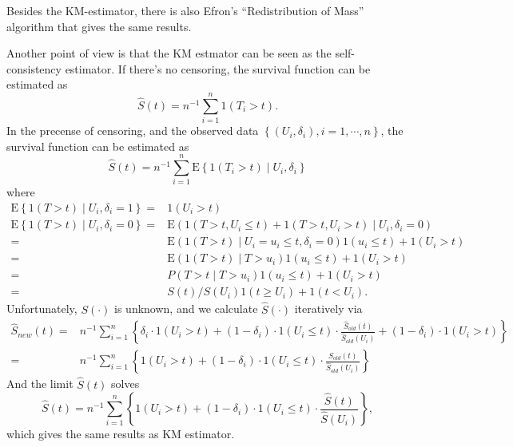 \documentclass[a4paper,12pt]{article}
\begin{document}
Besides the KM-estimator, there is also Efron's ``Redistribution of Mass'' algorithm that gives the same results.
\par
Another point of view is that the KM estmator can be seen as the self-consistency estimator. If there's no censoring, the survival function can be estimated as
\[
  \hat{S}\left(t\right) = n^{-1} \sum\limits_{i = 1}^n1\left(T_i > t\right)
  .
\]
In the precense of censoring, and the observed data $\left\{\left(U_i, \delta_i\right), i = 1, \cdots, n\right\}$, the survival function can be estimated as
\[
  \hat{S}\left(t\right)
  = n^{-1}\sum\limits_{i = 1}^n
  \mathrm{E}\left\{
    1\left(T_i > t\right)
    \middle| U_i, \delta_i
  \right\}
\]
where
\[
  \begin{aligned}
    \mathrm{E}\left\{1\left(T > t\right)\middle| U_i, \delta_i = 1\right\}
    =& 1(U_i > t)    \\
    \mathrm{E}\left\{1\left(T > t\right)\middle| U_i, \delta_i = 0\right\}
    =& \mathrm{E}\left(
       1\left(T > t, U_i \leq t\right)
       + 1\left(T > t, U_i > t\right)\middle| U_i, \delta_i = 0\right)    \\
    =& \mathrm{E}\left(
       1\left(T > t\right)\middle| U_i = u_i \leq t, \delta_i = 0\right)
       1\left(u_i \leq t\right)
       + 1\left(U_i > t\right)    \\
    =& \mathrm{E}\left(
       1\left(T > t\right)\middle| T > u_i\right)
       1\left(u_i \leq t\right)
       + 1\left(U_i > t\right)    \\
        =& P\left(
       T > t\middle| T > u_i\right)
       1\left(u_i \leq t\right)
       + 1\left(U_i > t\right)    \\
    =& S\left(t\right) / S\left(U_i\right) 1\left(t \geq U_i\right)
       + 1\left(t < U_i\right)
       .
  \end{aligned}
\]
Unfortunately, $S\left(\cdot\right)$ is unknown, and we calculate $\hat{S}\left(\cdot\right)$ iteratively via
\[
  \begin{aligned}
    \hat{S}_{new}\left(t\right)
    =& n^{-1}\sum\limits_{i = 1}^n\left\{
       \delta_i \cdot 1\left(U_i > t\right)
       + \left(1 - \delta_i\right) \cdot 1\left(U_i \leq t\right)
       \cdot \frac{\hat{S}_{old}\left(t\right)}{\hat{S}_{old}\left(U_i\right)}
       + \left(1 - \delta_i\right) \cdot 1\left(U_i > t\right)
       \right\}    \\
    =& n^{-1}\sum\limits_{i = 1}^n\left\{
       1\left(U_i > t\right)
       + \left(1 - \delta_i\right) \cdot 1\left(U_i \leq t\right)
       \cdot \frac{\hat{S}_{old}\left(t\right)}{\hat{S}_{old}\left(U_i\right)}
       \right\}
  \end{aligned}
\]
And the limit $\hat{S}\left(t\right)$ solves
\[
  \hat{S}\left(t\right)
  = n^{-1}\sum\limits_{i = 1}^n\left\{
    1\left(U_i > t\right)
    + \left(1 - \delta_i\right) \cdot 1\left(U_i \leq t\right)
    \cdot \frac{\hat{S}\left(t\right)}{\hat{S}\left(U_i\right)}
  \right\}
  ,
\]
which gives the same results as KM estimator.
\end{document}
